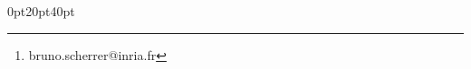 \usepackage[utf8]{inputenc}  
\usepackage[T1]{fontenc}
\usepackage[french]{babel}
\usepackage{adjustbox}

\usepackage[landscape,left=1cm,top=1.5cm,right=1cm,bottom=1.5cm]{geometry}

\usepackage{fancyhdr}
\usepackage{multicol}
\usepackage{hyperref}
\usepackage{eurosym}
\usepackage{graphicx}
\usepackage[dvipsnames]{xcolor}

\usepackage{minitoc}

\pagestyle{fancy}

\usepackage{titlesec}
\titleformat{\chapter}[display]
{\normalfont\huge\bfseries}{}{0pt}{\Huge}
\titlespacing*{\chapter} {0pt}{20pt}{40pt}

\title{\titre}
\author{Bruno Scherrer\footnote{bruno.scherrer@inria.fr}}
\date{\today}

